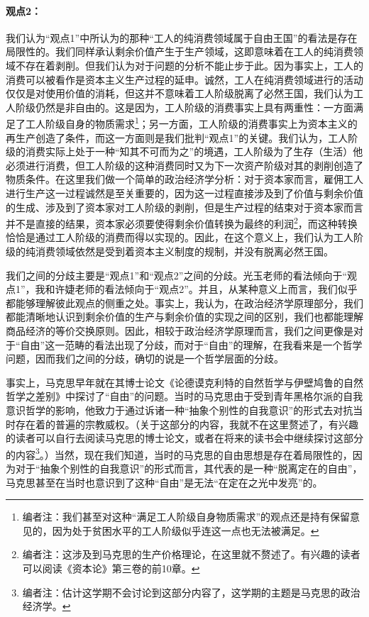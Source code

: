 \documentclass[a4paper,twoside,12pt,AutoFakeBold]{ctexart}
\begin{document}
\paragraph{观点2：}\begin{fangsong}
我们认为“观点1”中所认为的那种“工人的纯消费领域属于自由王国”的看法是存在局限性的。我们同样承认剩余价值产生于生产领域，这即意味着在工人的纯消费领域不存在着剥削。但我们认为对于问题的分析不能止步于此。因为事实上，工人的消费可以被看作是资本主义生产过程的延申。诚然，工人在纯消费领域进行的活动仅仅是对使用价值的消耗，但这并不意味着工人阶级脱离了必然王国，我们认为工人阶级仍然是非自由的。这是因为，工人阶级的消费事实上具有两重性：一方面满足了工人阶级自身的物质需求\footnote{编者注：我们甚至对这种“满足工人阶级自身物质需求”的观点还是持有保留意见的，因为处于贫困水平的工人阶级似乎连这一点也无法被满足。}；另一方面，工人阶级的消费事实上为资本主义的再生产创造了条件，而这一方面则是我们批判“观点1”的关键。我们认为，工人阶级的消费实际上处于一种“知其不可而为之”的境遇，工人阶级为了生存（生活）他必须进行消费，但工人阶级的这种消费同时又为下一次资产阶级对其的剥削创造了物质条件。在这里我们做一个简单的政治经济学分析：对于资本家而言，雇佣工人进行生产这一过程诚然是至关重要的，因为这一过程直接涉及到了价值与剩余价值的生成、涉及到了资本家对工人阶级的剥削，但是生产过程的结束对于资本家而言并不是直接的结果，资本家必须要使得剩余价值转换为最终的利润\footnote{编者注：这涉及到马克思的生产价格理论，在这里就不赘述了。有兴趣的读者可以阅读《资本论》第三卷的前10章。}，而这种转换恰恰是通过工人阶级的消费而得以实现的。因此，在这个意义上，我们认为工人阶级的纯消费领域依然是受到着资本主义制度的规制，并没有脱离必然王国。    
\end{fangsong}
\vspace{0.5cm} %

我们之间的分歧主要是“观点1”和“观点2”之间的分歧。光玉老师的看法倾向于“观点1”，我和许婕老师的看法倾向于“观点2”。并且，从某种意义上而言，我们似乎都能够理解彼此观点的侧重之处。事实上，我认为，在政治经济学原理部分，我们都能清晰地认识到剩余价值的生产与剩余价值的实现之间的区别，我们也都能理解商品经济的等价交换原则。因此，相较于政治经济学原理而言，我们之间更像是对于“自由”这一范畴的看法出现了分歧，而对于“自由”的理解，在我看来是一个哲学问题，因而我们之间的分歧，确切的说是一个哲学层面的分歧。

事实上，马克思早年就在其博士论文《论德谟克利特的自然哲学与伊壁鸠鲁的自然哲学之差别》中探讨了“自由”的问题。当时的马克思由于受到青年黑格尔派的自我意识哲学的影响，他致力于通过诉诸一种“抽象个别性的自我意识”的形式去对抗当时存在着的普遍的宗教威权。（关于这部分的内容，我就不在这里赘述了，有兴趣的读者可以自行去阅读马克思的博士论文，或者在将来的读书会中继续探讨这部分的内容\footnote{编者注：估计这学期不会讨论到这部分内容了，这学期的主题是马克思的政治经济学。}。）当然，现在我们知道，当时的马克思的自由思想是存在着局限性的，因为对于“抽象个别性的自我意识”的形式而言，其代表的是一种“脱离定在的自由”，马克思甚至在当时也意识到了这种“自由”是无法“在定在之光中发亮”的。
\end{document}
